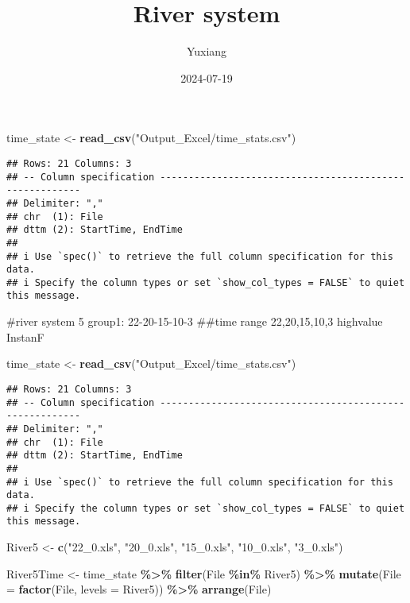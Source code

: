 \documentclass[
]{article}
\title{River system}
\author{Yuxiang}
\date{2024-07-19}
\newenvironment{Shaded}{\begin{snugshade}}{\end{snugshade}}
\newcommand{\AttributeTok}[1]{\textcolor[rgb]{0.13,0.29,0.53}{#1}}
\newcommand{\FunctionTok}[1]{\textcolor[rgb]{0.13,0.29,0.53}{\textbf{#1}}}
\newcommand{\NormalTok}[1]{#1}
\newcommand{\OtherTok}[1]{\textcolor[rgb]{0.56,0.35,0.01}{#1}}
\newcommand{\SpecialCharTok}[1]{\textcolor[rgb]{0.81,0.36,0.00}{\textbf{#1}}}
\newcommand{\StringTok}[1]{\textcolor[rgb]{0.31,0.60,0.02}{#1}}
\begin{document}
\maketitle

\begin{Shaded}
\begin{Highlighting}[]
\NormalTok{time\_state }\OtherTok{\textless{}{-}} \FunctionTok{read\_csv}\NormalTok{(}\StringTok{"Output\_Excel/time\_stats.csv"}\NormalTok{)}
\end{Highlighting}
\end{Shaded}

\begin{verbatim}
## Rows: 21 Columns: 3
## -- Column specification --------------------------------------------------------
## Delimiter: ","
## chr  (1): File
## dttm (2): StartTime, EndTime
## 
## i Use `spec()` to retrieve the full column specification for this data.
## i Specify the column types or set `show_col_types = FALSE` to quiet this message.
\end{verbatim}

\#river system 5 group1: 22-20-15-10-3 \#\#time range 22,20,15,10,3
highvalue InstanF

\begin{Shaded}
\begin{Highlighting}[]
\NormalTok{time\_state }\OtherTok{\textless{}{-}} \FunctionTok{read\_csv}\NormalTok{(}\StringTok{"Output\_Excel/time\_stats.csv"}\NormalTok{)}
\end{Highlighting}
\end{Shaded}

\begin{verbatim}
## Rows: 21 Columns: 3
## -- Column specification --------------------------------------------------------
## Delimiter: ","
## chr  (1): File
## dttm (2): StartTime, EndTime
## 
## i Use `spec()` to retrieve the full column specification for this data.
## i Specify the column types or set `show_col_types = FALSE` to quiet this message.
\end{verbatim}

\begin{Shaded}
\begin{Highlighting}[]
\NormalTok{River5 }\OtherTok{\textless{}{-}} \FunctionTok{c}\NormalTok{(}\StringTok{"22\_0.xls"}\NormalTok{, }\StringTok{"20\_0.xls"}\NormalTok{, }\StringTok{"15\_0.xls"}\NormalTok{, }\StringTok{"10\_0.xls"}\NormalTok{, }\StringTok{"3\_0.xls"}\NormalTok{)}

\NormalTok{River5Time }\OtherTok{\textless{}{-}}\NormalTok{ time\_state }\SpecialCharTok{\%\textgreater{}\%}
  \FunctionTok{filter}\NormalTok{(File }\SpecialCharTok{\%in\%}\NormalTok{ River5) }\SpecialCharTok{\%\textgreater{}\%}
  \FunctionTok{mutate}\NormalTok{(}\AttributeTok{File =} \FunctionTok{factor}\NormalTok{(File, }\AttributeTok{levels =}\NormalTok{ River5)) }\SpecialCharTok{\%\textgreater{}\%} 
  \FunctionTok{arrange}\NormalTok{(File)}
\end{Highlighting}
\end{Shaded}
\end{document}
